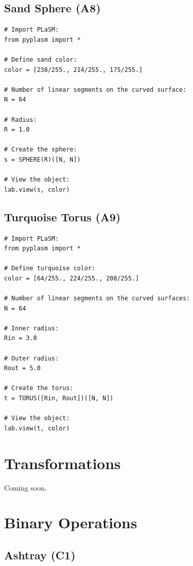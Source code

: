 \documentclass[article,A4,12pt]{llncs}
\begin{document}
\subsection{Sand Sphere (A8)}

\begin{verbatim}
# Import PLaSM:
from pyplasm import *

# Define sand color:
color = [238/255., 214/255., 175/255.]

# Number of linear segments on the curved surface:
N = 64

# Radius:
R = 1.0

# Create the sphere:
s = SPHERE(R)([N, N])

# View the object:
lab.view(s, color)
\end{verbatim}


\subsection{Turquoise Torus (A9)}

\begin{verbatim}
# Import PLaSM:
from pyplasm import *

# Define turquoise color:
color = [64/255., 224/255., 208/255.]

# Number of linear segments on the curved surfaces:
N = 64

# Inner radius:
Rin = 3.0

# Outer radius:
Rout = 5.0

# Create the torus:
t = TORUS([Rin, Rout])([N, N])

# View the object:
lab.view(t, color)
\end{verbatim}





\section{Transformations}

Coming soon.





\section{Binary Operations}

\subsection{Ashtray (C1)}
\end{document}
